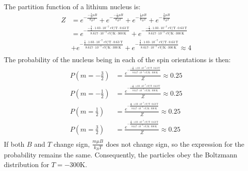 \documentclass{article}
\begin{document}
The partition function of a lithium nucleus is:
\begin{equation}
    \begin{split}
        Z & = e^{-\frac{-\frac{3}{2}\mu B}{k_BT}} + e^{-\frac{-\frac{1}{2}\mu B}{k_BT}} + e^{-\frac{\frac{1}{2}\mu B}{k_BT}} + e^{-\frac{\frac{3}{2}\mu B}{k_BT}} \\
        & = e^{-\frac{-\frac{3}{2} \cdot 1.03 \cdot 10^{-7}~\unit{eV\per\tesla}\cdot 0.63~\unit{\tesla}}{8.617 \cdot 10^{-5}~\unit{eV\per\kelvin} \cdot 300~\unit{\kelvin}}} + e^{-\frac{-\frac{1}{2} \cdot 1.03 \cdot 10^{-7}~\unit{eV\per\tesla}\cdot 0.63~\unit{\tesla}}{8.617 \cdot 10^{-5}~\unit{eV\per\kelvin} \cdot 300~\unit{\kelvin}}} \\
        & + e^{-\frac{\frac{1}{2} \cdot 1.03 \cdot 10^{-7}~\unit{eV\per\tesla}\cdot 0.63~\unit{\tesla}}{8.617 \cdot 10^{-5}~\unit{eV\per\kelvin} \cdot 300~\unit{\kelvin}}} + e^{-\frac{\frac{3}{2} \cdot 1.03 \cdot 10^{-7}~\unit{eV\per\tesla}\cdot 0.63~\unit{\tesla}}{8.617 \cdot 10^{-5}~\unit{eV\per\kelvin} \cdot 300~\unit{\kelvin}}} \approx 4 \\
    \end{split}
\end{equation}
The probability of the nucleus being in each of the spin orientations is then:
\begin{equation}
    \begin{split}
        P\left(m = -\frac{3}{2}\right) & = \frac{e^{-\frac{-\frac{3}{2} \cdot 1.03 \cdot 10^{-7}~\unit{eV\per\tesla}\cdot 0.63~\unit{\tesla}}{8.617 \cdot 10^{-5}~\unit{eV\per\kelvin} \cdot 300~\unit{\kelvin}}}}{Z} \approx 0.25 \\
        P\left(m = -\frac{1}{2}\right) & = \frac{e^{-\frac{-\frac{1}{2} \cdot 1.03 \cdot 10^{-7}~\unit{eV\per\tesla}\cdot 0.63~\unit{\tesla}}{8.617 \cdot 10^{-5}~\unit{eV\per\kelvin} \cdot 300~\unit{\kelvin}}}}{Z} \approx 0.25 \\
        P\left(m = \frac{1}{2}\right) & = \frac{e^{-\frac{\frac{a}{2} \cdot 1.03 \cdot 10^{-7}~\unit{eV\per\tesla}\cdot 0.63~\unit{\tesla}}{8.617 \cdot 10^{-5}~\unit{eV\per\kelvin} \cdot 300~\unit{\kelvin}}}}{Z} \approx 0.25 \\
        P\left(m = \frac{3}{2}\right) & = \frac{e^{-\frac{\frac{3}{2} \cdot 1.03 \cdot 10^{-7}~\unit{eV\per\tesla}\cdot 0.63~\unit{\tesla}}{8.617 \cdot 10^{-5}~\unit{eV\per\kelvin} \cdot 300~\unit{\kelvin}}}}{Z} \approx 0.25 \\
    \end{split}
\end{equation}
If both $B$ and $T$ change sign, $\frac{m\mu B}{k_BT}$ does not change sign, so the expression for the probability remains the same. Consequently, the particles obey the Boltzmann distribution for $T = -300 \unit{\kelvin}$.
\end{document}
